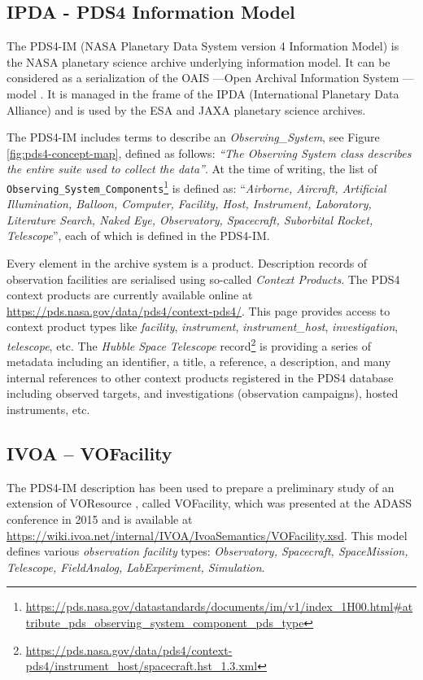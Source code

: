 \documentclass[11pt,a4paper]{ivoa}
\begin{document}
\subsection{IPDA - PDS4 Information Model}
The PDS4-IM (NASA Planetary Data System version 4 Information Model)
is the NASA planetary science archive underlying information
model. It can be considered as a serialization of the OAIS ---Open
Archival Information System \citep{iso:oais}--- model \citep{Hughes:2017bt}.
It is managed in the frame of the IPDA (International Planetary
Data Alliance) and is used by the ESA and JAXA planetary science
archives.

The PDS4-IM includes terms to describe an \emph{Observing\_System}, see
Figure \ref{fig:pds4-concept-map}, defined as follows:
\emph{``The Observing System class describes the entire suite used to
collect the data''}. At the time of writing, the list of
\texttt{Observing\_System\_Components}\footnote{
\url{https://pds.nasa.gov/datastandards/documents/im/v1/index_1H00.html\#attribute_pds_observing_system_component_pds_type}}
is defined as: ``\emph{Airborne, Aircraft, Artificial Illumination,
Balloon, Computer, Facility, Host, Instrument, Laboratory, Literature
Search, Naked Eye, Observatory, Spacecraft, Suborbital Rocket,
Telescope}'', each of which is defined in the PDS4-IM.

Every element in the archive system is a product. Description records of
observation facilities are serialised using so-called
\emph{Context Products}. The PDS4 context
products are currently available online at
\url{https://pds.nasa.gov/data/pds4/context-pds4/}. This
page provides access to context product types like \emph{facility},
\emph{instrument}, \emph{instrument\_host}, \emph{investigation},
\emph{telescope}, etc. The \emph{Hubble Space Telescope}
record\footnote{\protect\url{https://pds.nasa.gov/data/pds4/context-pds4/instrument_host/spacecraft.hst_1.3.xml}}
is providing a series of metadata including an identifier, a title,
a reference, a description, and many internal references to other
context products registered in the PDS4 database including
observed targets, and investigations (observation campaigns), hosted
instruments, etc.

\subsection{IVOA -- VOFacility}

The PDS4-IM description has been used to prepare a preliminary study of
an extension of VOResource \citep{2018ivoa.spec.0625P}, called VOFacility,
which was presented at the ADASS conference in 2015 \citep{Louys:2015to}
and is available at \url{https://wiki.ivoa.net/internal/IVOA/IvoaSemantics/VOFacility.xsd}.
This model defines various \emph{observation facility} types:
\emph{Observatory, Spacecraft, SpaceMission, Telescope, FieldAnalog,
LabExperiment, Simulation}.
\end{document}

